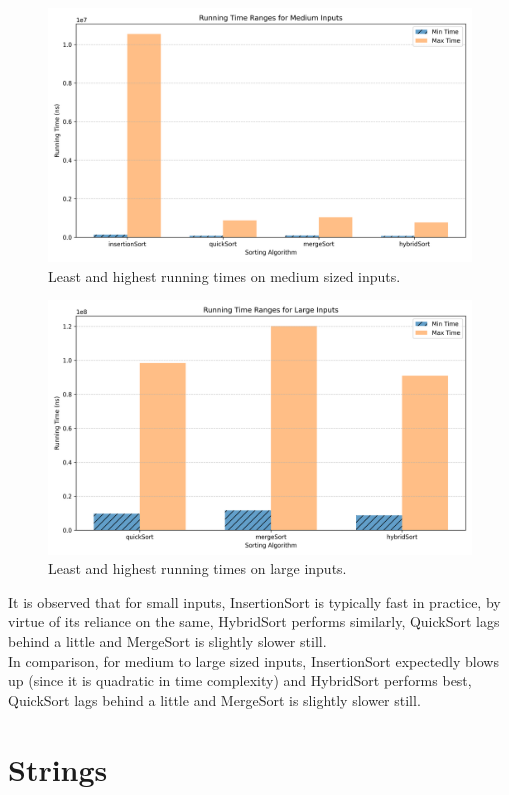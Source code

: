 \documentclass[12pt]{article}
\begin{document}
\begin{figure}[H]
  \centering
  \includegraphics[width=0.7\linewidth]{sorting-stats-medium.png}
  \caption{Least and highest running times on medium sized inputs.}
\end{figure}

\begin{figure}[H]
  \centering
  \includegraphics[width=0.7\linewidth]{sorting-stats-large.png}
  \caption{Least and highest running times on large inputs.}
\end{figure}

It is observed that for small inputs, InsertionSort is typically fast in practice, by virtue of its reliance on the same, HybridSort performs similarly, QuickSort lags behind a little and MergeSort is slightly slower still. \\
In comparison, for medium to large sized inputs, InsertionSort expectedly blows up (since it is quadratic in time complexity) and HybridSort performs best, QuickSort lags behind a little and MergeSort is slightly slower still.

\section{Strings}\label{sec:strings-detail}
\end{document}
